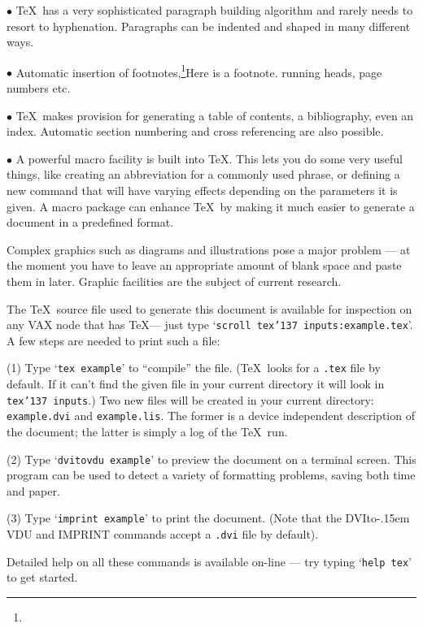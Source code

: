 {\parskip=0pt       %
\item{$\bullet$}
\TeX\ has a very sophisticated paragraph building algorithm and rarely needs
to resort to hyphenation.  Paragraphs can be indented and shaped in many
different ways.

\item{$\bullet$}
Automatic insertion of footnotes,\footnote{\dag}{\ninerm Here is
a footnote.} running heads, page numbers etc.

\item{$\bullet$}
\TeX\ makes provision for generating a table of contents, a bibliography, even
an index.  Automatic section numbering and cross referencing are also possible.

\item{$\bullet$}
A powerful macro facility is built into \TeX.  This lets you do some very
useful things, like creating an abbreviation for a commonly used phrase, or
defining a new command that will have varying effects depending on the
parameters it is given.  A macro package can enhance \TeX\ by making it much
easier to generate a document in a predefined format.
\par                %
}                   %


Complex graphics such as diagrams and illustrations pose
a major problem --- at the moment you have to leave an appropriate amount of
blank space and paste them in later.
Graphic facilities are the subject of current research.


The \TeX\ source file used to generate this document is available for
inspection on any VAX node that has \TeX ---
just type `{\tt scroll tex\char'137 inputs:example.tex}'.
A few steps are needed to print such a file:

\item{(1)}
Type `{\tt tex example}' to ``compile'' the file.
(\TeX\ looks for a {\tt .tex} file by default.  If it can't find the given
file in your current directory it will look in {\tt tex\char'137 inputs}.)
Two new files will be created in your current directory:
{\tt example.dvi} and {\tt example.lis}.
The former is a device independent description of the document;
the latter is simply a log of the \TeX\ run.

{\parskip=0pt    %
\item{(2)}
Type `{\tt dvitovdu example}' to preview the document on a terminal screen.
This program can be used to detect a variety of formatting problems,
saving both time and paper.

\item{(3)}
Type `{\tt imprint example}' to print the document.
(Note that the DVIto\kern-.15em VDU and IMPRINT commands
accept a {\tt .dvi} file by default).

}                %

Detailed help on all these commands is available on-line --- try typing
`{\tt help tex}' to get started.

\bye
